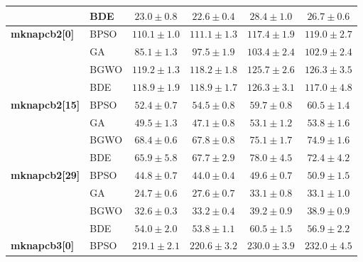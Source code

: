 \begin{table}[htbp]
\begin{tabular*}{\textwidth}{@{\extracolsep{\fill}}llcccc@{}}
                       & BDE   &           $23.0 \pm 0.8$ &  $\mathbf{22.6 \pm 0.4}$ &           $28.4 \pm 1.0$ &           $26.7 \pm 0.6$ \\
    \midrule
    \textbf{mknapcb2[0]} & BPSO  & $\mathbf{110.1 \pm 1.0}$ &          $111.1 \pm 1.3$ &          $117.4 \pm 1.9$ &          $119.0 \pm 2.7$ \\
                       & GA    &  $\mathbf{85.1 \pm 1.3}$ &           $97.5 \pm 1.9$ &          $103.4 \pm 2.4$ &          $102.9 \pm 2.4$ \\
                       & BGWO  &          $119.2 \pm 1.3$ & $\mathbf{118.2 \pm 1.8}$ &          $125.7 \pm 2.6$ &          $126.3 \pm 3.5$ \\
                       & BDE   &          $118.9 \pm 1.9$ &          $118.9 \pm 1.7$ &          $126.3 \pm 3.1$ & $\mathbf{117.0 \pm 4.8}$ \\
    \midrule
    \textbf{mknapcb2[15]} & BPSO  &  $\mathbf{52.4 \pm 0.7}$ &           $54.5 \pm 0.8$ &           $59.7 \pm 0.8$ &           $60.5 \pm 1.4$ \\
                       & GA    &           $49.5 \pm 1.3$ &  $\mathbf{47.1 \pm 0.8}$ &           $53.1 \pm 1.2$ &           $53.8 \pm 1.6$ \\
                       & BGWO  &           $68.4 \pm 0.6$ &  $\mathbf{67.8 \pm 0.8}$ &           $75.1 \pm 1.7$ &           $74.9 \pm 1.6$ \\
                       & BDE   &  $\mathbf{65.9 \pm 5.8}$ &           $67.7 \pm 2.9$ &           $78.0 \pm 4.5$ &           $72.4 \pm 4.2$ \\
    \midrule
    \textbf{mknapcb2[29]} & BPSO  &           $44.8 \pm 0.7$ &  $\mathbf{44.0 \pm 0.4}$ &           $49.6 \pm 0.7$ &           $50.9 \pm 1.5$ \\
                       & GA    &  $\mathbf{24.7 \pm 0.6}$ &           $27.6 \pm 0.7$ &           $33.1 \pm 0.8$ &           $33.1 \pm 1.0$ \\
                       & BGWO  &  $\mathbf{32.6 \pm 0.3}$ &           $33.2 \pm 0.4$ &           $39.2 \pm 0.9$ &           $38.9 \pm 0.9$ \\
                       & BDE   &           $54.0 \pm 2.0$ &  $\mathbf{53.8 \pm 1.1}$ &           $60.5 \pm 1.5$ &           $56.9 \pm 2.2$ \\
    \midrule
    \textbf{mknapcb3[0]} & BPSO  & $\mathbf{219.1 \pm 2.1}$ &          $220.6 \pm 3.2$ &          $230.0 \pm 3.9$ &          $232.0 \pm 4.5$ \\

\end{tabular*}
\end{table}
